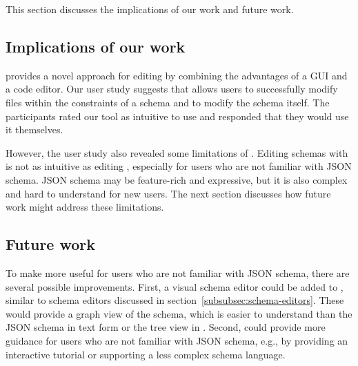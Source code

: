 This section discusses the implications of our work and future work.


\subsection{Implications of our work}\label{subsec:implications-of-our-work}

\toolname{} provides a novel approach for editing \cfgfiles{}
by combining the advantages of a GUI and a code editor.
Our user study suggests that \toolname{} allows users to successfully modify files within the constraints of a schema and to modify the schema itself.
The participants rated our tool as intuitive to use and responded that they would use it themselves.

However, the user study also revealed some limitations of \toolname{}.
Editing schemas with \toolname{} is not as intuitive as editing \cfgfiles{},
especially for users who are not familiar with JSON schema.
JSON schema may be feature-rich and expressive, but it is also complex and
hard to understand for new users.
The next section discusses how future work might address these limitations.

\subsection{Future work}\label{subsec:future-work}
To make \toolname{} more useful for users who are not familiar with JSON schema,
there are several possible improvements.
First, a visual schema editor could be added to \toolname{}, similar to schema editors
discussed in section~\ref{subsubsec:schema-editors}.
These would provide a graph view of the schema, which is easier to understand than
the JSON schema in text form or the tree view in \toolname{}.
Second, \toolname{} could provide more guidance for users who are not familiar with JSON schema,
e.g., by providing an interactive tutorial or supporting a less complex schema language.


